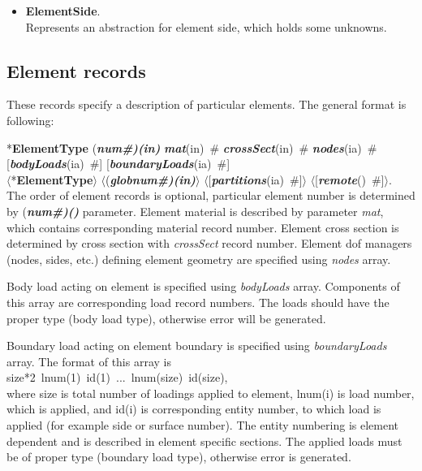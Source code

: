 \documentclass[draft]{article}
\newcommand{\param}[1]{{\em #1}}
\newcommand{\fieldVal}[2]{\mbox{({\it\bf{#1}\#)\tiny (#2)}}}
\newcommand{\keywordnotype}[1]{\mbox{{\it{\bf{#1}}}}}
\newcommand{\keyword}[2]{\mbox{{\keywordnotype{#1}\tiny (#2)}}}
\newcommand{\entKeyword}[1]{\mbox{{*{\bf{#1}}}}}
\newcommand{\entKeywordInst}[1]{\mbox{{\bf{{#1}}}}}
\newcommand{\field}[2]{\mbox{\keyword{#1}{#2}~\#}}
\newcommand{\optField}[2]{\mbox{[\field{#1}{#2}]}}
\newcommand{\PfieldVal}[2]{\mbox{$\langle$({\it\bf{#1}\#)\tiny (#2)}$\rangle$}}
\newcommand{\PentKeyword}[1]{\mbox{{$\langle$*{\bf{#1}}$\rangle$}}}
\newcommand{\PoptField}[2]{\mbox{$\langle$[\field{#1}{#2}]$\rangle$}}
\begin{document}
\begin{itemize}
\item
\entKeywordInst{ElementSide}.\\
Represents an abstraction for element side, which holds some unknowns.
\end{itemize}

\subsection{Element records}
\label{_ElementsRecords}
These records specify a description of particular elements. The
general format is following:

\entKeyword{ElementType} \fieldVal{num}{in} \field{mat}{in}
\field{crossSect}{in} \field{nodes}{ia}\\
\optField{bodyLoads}{ia} \optField{boundaryLoads}{ia}\\
\PentKeyword{ElementType} \PfieldVal{globnum}{in} 
\PoptField{partitions}{ia} \PoptField{remote}{}.\\

The order of element records is optional, particular element number is determined by \fieldVal{num}{} parameter. Element
material is described by parameter \param{mat}, which contains corresponding
material record number. Element cross
section is determined by cross section  with  \param{crossSect}
record number. Element dof managers (nodes, sides, etc.) defining element geometry are specified using
\param{nodes} array.

Body load acting on element is specified using \param{bodyLoads} array. Components
of this array are corresponding load record numbers. The loads should
have the proper type (body load type), otherwise error will be generated.

Boundary load acting on element boundary is specified using
\param{boundaryLoads} array. The format of this array is\\
size*2~lnum(1)~id(1)~...~lnum(size)~id(size),\\
where size is total number of loadings applied to element,
lnum(i) is load number, which is applied, and id(i)
is corresponding entity number, to which load is applied (for example
side or surface number). The entity numbering is element dependent and
is described in element specific sections. The applied loads must be
of proper type (boundary load type), otherwise error is generated. 
\end{document}

